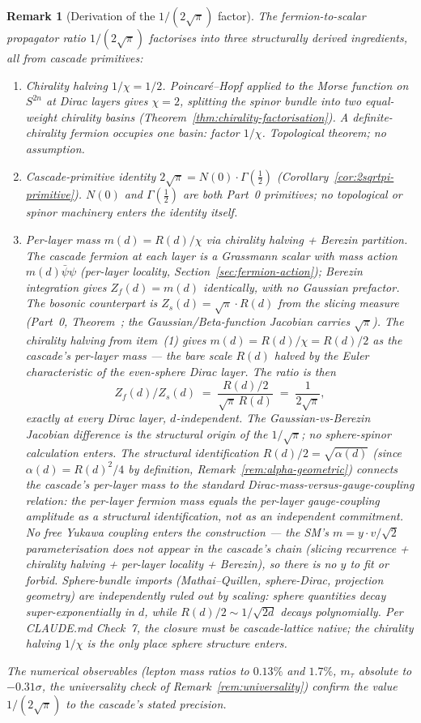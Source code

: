 \documentclass[12pt,a4paper]{article}
\newtheorem*{remark}{Remark}
\begin{document}
\begin{remark}[Derivation of the $1/(2\sqrt{\pi})$ factor]\label{rem:sp31-status}
The fermion-to-scalar propagator ratio $1/(2\sqrt{\pi})$ factorises into three structurally derived ingredients, all from cascade primitives:
\begin{enumerate}
\item \emph{Chirality halving $1/\chi = 1/2$.} Poincar\'e--Hopf applied to the Morse function on $S^{2n}$ at Dirac layers gives $\chi = 2$, splitting the spinor bundle into two equal-weight chirality basins (Theorem~\ref{thm:chirality-factorisation}). A definite-chirality fermion occupies one basin: factor $1/\chi$. Topological theorem; no assumption.
\item \emph{Cascade-primitive identity $2\sqrt{\pi} = N(0)\cdot\Gamma(\tfrac12)$} (Corollary~\ref{cor:2sqrtpi-primitive}). $N(0)$ and $\Gamma(\tfrac12)$ are both Part~0 primitives; no topological or spinor machinery enters the identity itself.
\item \emph{Per-layer mass $m(d) = R(d)/\chi$ via chirality halving + Berezin partition.} The cascade fermion at each layer is a Grassmann scalar with mass action $m(d)\bar\psi\psi$ (per-layer locality, Section~\ref{sec:fermion-action}); Berezin integration gives $Z_f(d) = m(d)$ identically, with no Gaussian prefactor. The bosonic counterpart is $Z_s(d) = \sqrt{\pi}\cdot R(d)$ from the slicing measure (Part~0, Theorem~; the Gaussian/Beta-function Jacobian carries $\sqrt{\pi}$). The chirality halving from item~(1) gives $m(d) = R(d)/\chi = R(d)/2$ as the cascade's per-layer mass --- the bare scale $R(d)$ halved by the Euler characteristic of the even-sphere Dirac layer. The ratio is then
\[
Z_f(d)/Z_s(d) \;=\; \frac{R(d)/2}{\sqrt{\pi}\,R(d)} \;=\; \frac{1}{2\sqrt{\pi}},
\]
exactly at every Dirac layer, $d$-independent. The Gaussian-vs-Berezin Jacobian difference is the structural origin of the $1/\sqrt{\pi}$; no sphere-spinor calculation enters. The structural identification $R(d)/2 = \sqrt{\alpha(d)}$ (since $\alpha(d) = R(d)^2/4$ by definition, Remark~\ref{rem:alpha-geometric}) connects the cascade's per-layer mass to the standard Dirac-mass-versus-gauge-coupling relation: the per-layer fermion mass equals the per-layer gauge-coupling amplitude as a structural identification, not as an independent commitment. \emph{No free Yukawa coupling enters the construction} --- the SM's $m = y\cdot v/\sqrt{2}$ parameterisation does not appear in the cascade's chain (slicing recurrence + chirality halving + per-layer locality + Berezin), so there is no $y$ to fit or forbid. Sphere-bundle imports (Mathai--Quillen, sphere-Dirac, projection geometry) are independently ruled out by scaling: sphere quantities decay super-exponentially in $d$, while $R(d)/2 \sim 1/\sqrt{2d}$ decays polynomially. Per CLAUDE.md Check~7, the closure must be cascade-lattice native; the chirality halving $1/\chi$ is the only place sphere structure enters.
\end{enumerate}
The numerical observables (lepton mass ratios to $0.13\%$ and $1.7\%$, $m_\tau$ absolute to $-0.31\sigma$, the universality check of Remark~\ref{rem:universality}) confirm the value $1/(2\sqrt{\pi})$ to the cascade's stated precision.


\end{remark}
\end{document}
